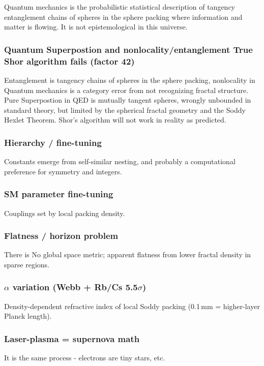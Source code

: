 \documentclass[11pt,a4paper]{article}
\begin{document}
Quantum mechanics is the probabilistic statistical description of tangency entanglement chains of spheres in the sphere packing where information and matter is flowing. It is not epistemological in this universe. 


\subsubsection{
 Quantum Superpostion and nonlocality/entanglement
True Shor algorithm fails (factor 42)
 } 
 Entanglement is tangency chains of spheres in the sphere packing, nonlocality in Quantum mechanics is a category error from not recognizing fractal structure. Pure Superpostion in QED is mutually tangent spheres, wrongly unbounded in standard theory, but limited by the spherical fractal geometry and the Soddy Hexlet Theorem. Shor's algorithm will not work in reality as predicted. 

\subsubsection{
 Hierarchy / fine-tuning 
 } 
Constants emerge from self-similar nesting, and probably a computational preference for symmetry and integers. 

\subsubsection{
 SM parameter fine-tuning 
 } 
Couplings set by local packing density.

\subsubsection{
 Flatness / horizon problem 
 } 
 There is No global space metric; apparent flatness from lower fractal density in sparse regions.

\subsubsection{
 $\alpha$ variation (Webb + Rb/Cs 5.5$\sigma$)
 } 
 Density-dependent refractive index of local Soddy packing (0.1\,mm = higher-layer Planck length).

\subsubsection{
 Laser-plasma = supernova math
 }
 It is the same process - electrons are tiny stars, etc.
\end{document}
